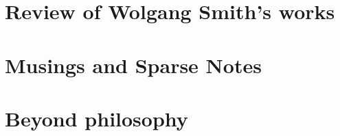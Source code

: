 \documentclass[a4paper,12pt,twoside]{book}
\begin{document}
\chapter{Review of Wolgang Smith's works}




\chapter{Musings and Sparse Notes}







\chapter{Beyond philosophy}




















\end{document}
